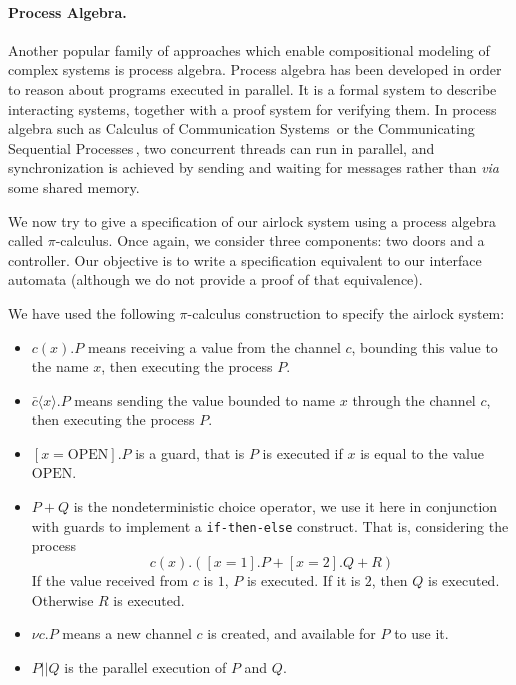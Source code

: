 \paragraph{Process Algebra.}
%
Another popular family of approaches which enable compositional modeling of
complex systems is process algebra.
%
Process algebra has been developed in order to reason about programs executed in
parallel.
%
It is a formal system to describe interacting systems, together with a proof
system for verifying them.
%
In process algebra such as Calculus of Communication
Systems\,\cite{milner1980ccs} or the Communicating Sequential
Processes\,\cite{hoare1978csp}, two concurrent threads can run in parallel, and
synchronization is achieved by sending and waiting for messages rather than
\emph{via} some shared memory.

\begin{example}
  \label{example:sota:airlockprocess}

  We now try to give a specification of our airlock system using a process
  algebra called \( \pi \)-calculus.
  Once again, we consider three components: two doors and a controller.
  Our objective is to write a specification equivalent to our interface automata
  (although we do not provide a proof of that equivalence).

  We have used the following \( \pi \)-calculus construction to specify the
  airlock system:
  \begin{itemize}
  \item \( c(x). P\) means receiving a value from the channel \( c \), bounding
    this value to the name \( x \), then executing the process \( P \).
  \item \( \bar{c} \langle x \rangle . P \) means sending the value bounded to
    name \( x \) through the channel \( c \), then executing the process
    \( P \).
  \item \( [x = \mathrm{OPEN}] . P \) is a guard, that is \( P \) is executed if
    \( x \) is equal to the value \( \mathrm{OPEN} \).
  \item \( P + Q \) is the nondeterministic choice operator, we use it here in
    conjunction with guards to implement a \texttt{if-then-else} construct. That
    is, considering the process
    \[
      c(x) . ([x = 1] . P + [x = 2] . Q + R)
    \]
    If the value received from \( c \) is \( 1 \), \( P \) is executed.
    If it is \( 2 \), then \( Q \) is executed. Otherwise \( R \) is executed.
  \item \( \nu c. P \) means a new channel \( c \) is created, and available for
    \( P \) to use it.
  \item \( P || Q \) is the parallel execution of \( P \) and \( Q \).
  \end{itemize}


\end{example}
